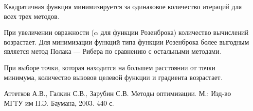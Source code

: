 \documentclass[12pt, a4paper]{article}
\begin{document}
Квадратичная функция минимизируется за одинаковое количество итераций для всех трех методов.

При увеличении овражности ($\alpha$ для функции Розенброка) количество вычислений возрастает. Для минимизации функций типа функции Розенброка более выгодным является метод Полака --- Рибера по сравнению с остальными методами.

При выборе точки, которая находится на большем расстоянии от точки минимума, количество вызовов целевой функции и градиента возрастает.

\begin{thebibliography}{10}
 Аттетков А.В., Галкин С.В., Зарубин С.В. Методы оптимизации. М.: Изд-во МГТУ им Н.Э. Баумана, 2003. 440 с.
\end{thebibliography}
\end{document}
